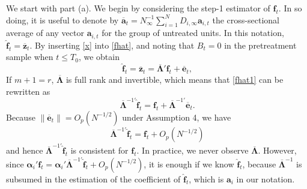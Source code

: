 \documentclass[12pt,fleqn]{article}
\def\*#1{\mathbf{#1}}
\def\+#1{\boldsymbol{#1}}
\begin{document}
\noindent We start with part (a). We begin by considering the step-1 estimator of $\*f_t$. In so doing, it is useful to denote by $\overline{\*a}_t = N_{\infty}^{-1}\sum_{i = 1}^N D_{i,\infty} \*a_{i,t}$ the cross-sectional average of any vector $\*a_{i,t}$ for the group of untreated units. In this notation, $\widehat{\*{f}}_t = \overline {\*z}_t$. By inserting \eqref{x} into \eqref{fhat}, and noting that $B_t = 0$ in the pretreatment sample when $t \leq T_0$, we obtain
\begin{equation}\label{fhat1}
\widehat{\*{f}}_t = \overline {\*{z}}_t = \overline{\+\Lambda}'\*{f}_t + \overline {\*e}_{t},
\end{equation}
If $m+1=r$, $\overline{\+\Lambda}$ is full rank and invertible, which means that \eqref{fhat1} can be rewritten as
\begin{equation}\label{redefined}
    \overline{\+\Lambda}^{-1\prime}\widehat{\*{f}}_t=\*{f}_t+\overline{\+\Lambda}^{-1\prime}\overline{\*e}_t .
\end{equation}
Because $\|\overline{\*e}_t\|=O_p(N^{-1/2})$ under Assumption 4, we have
\begin{equation}\label{redefined2}
\overline{\+\Lambda}^{-1\prime}\widehat{\*{f}}_t = \*{f}_t + O_p(N^{-1/2})
\end{equation}
and hence $\overline{\+\Lambda}^{-1\prime} \widehat{\*{f}}_t$ is consistent for $\*{f}_t$. In practice, we never observe $\overline{\+\Lambda}$. However, since $\+{\alpha}_i'\*{f}_t = \+{\alpha}_i' \overline{\+\Lambda}^{-1\prime}\widehat{\*{f}}_t + O_p(N^{-1/2})$, it is enough if we know $\widehat{\*{f}}_t$, because $\overline{\+\Lambda}^{-1}$ is subsumed in the estimation of the coefficient of $\widehat{\*{f}}_t$, which is $\*a_i$ in our notation.
\end{document}
